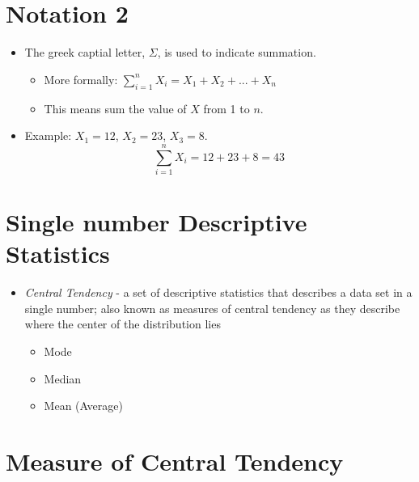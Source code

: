 \documentclass[12pt]{article}
\begin{document}
\section{Notation 2}\label{notation-2}

\begin{itemize}
\itemsep1pt\parskip0pt
\item
  The greek captial letter, \(\Sigma\), is used to indicate summation.

  \begin{itemize}
  \itemsep1pt\parskip0pt
  \item
    More formally:
    \(\displaystyle \sum^{n}_{i=1} X_{i} = X_{1} + X_{2} + ... + X_{n}\)
  \item
    This means sum the value of \(X\) from 1 to \(n\).
  \end{itemize}
\item
  Example: \(X_{1} = 12\), \(X_{2} = 23\), \(X_{3} = 8\).
  \[ \displaystyle \sum_{i=1}^{n} X_{i} = 12 + 23 + 8 = 43  \]
\end{itemize}

\section{Single number Descriptive
Statistics}\label{single-number-descriptive-statistics}

\begin{itemize}
\itemsep1pt\parskip0pt
\item
  \emph{Central Tendency} - a set of descriptive statistics that
  describes a data set in a single number; also known as measures of
  central tendency as they describe where the center of the distribution
  lies

  \begin{itemize}
  \itemsep1pt\parskip0pt
  \item
    Mode
  \item
    Median
  \item
    Mean (Average)
  \end{itemize}
\end{itemize}

\section{Measure of Central Tendency}\label{measure-of-central-tendency}
\end{document}
